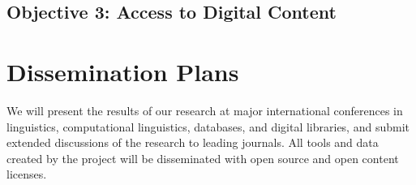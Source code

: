 \documentclass[11pt]{nsf}
\begin{document}
\vspace{1in}

\subsection*{Objective 3: Access to Digital Content}

\vspace{1in}

\section{Dissemination Plans}
\label{sec:dissemination}

We will present the results of our research at major international
conferences in linguistics, computational linguistics, databases, and
digital libraries, and submit extended discussions of the research to
leading journals.  All tools and data created by the project will be
disseminated with open source and open content licenses.

\vfil\pagebreak

\raggedright\small
\pagestyle{fancy}
\setcounter{page}{1}

\end{document}
